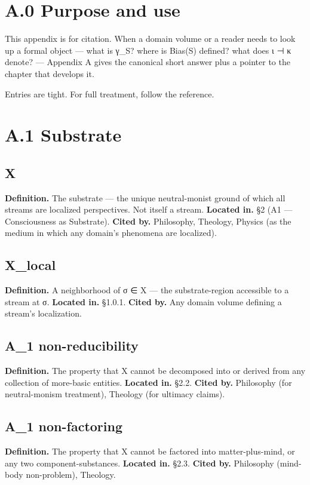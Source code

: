 \documentclass[11pt, openany]{book}
\newcommand{\sectionbreak}{\clearpage}
\begin{document}
\sectionbreak

\section{A.0 Purpose and use}

This appendix is for citation. When a domain volume or a reader needs to look up a formal object --- what is γ\_\allowbreak{}S? where is Bias(S) defined? what does ι ⊣ κ denote? --- Appendix A gives the canonical short answer plus a pointer to the chapter that develops it.

Entries are tight. For full treatment, follow the reference.

\sectionbreak

\section{A.1 Substrate}

\subsection{X}
\textbf{Definition.} The substrate --- the unique neutral-monist ground of which all streams are localized perspectives. Not itself a stream.
\textbf{Located in.} §2 (A1 --- Consciousness as Substrate).
\textbf{Cited by.} Philosophy, Theology, Physics (as the medium in which any domain's phenomena are localized).

\subsection{X\_\allowbreak{}local}
\textbf{Definition.} A neighborhood of σ ∈ X --- the substrate-region accessible to a stream at σ.
\textbf{Located in.} §1.0.1.
\textbf{Cited by.} Any domain volume defining a stream's localization.

\subsection{A\_\allowbreak{}1 non-reducibility}
\textbf{Definition.} The property that X cannot be decomposed into or derived from any collection of more-basic entities.
\textbf{Located in.} §2.2.
\textbf{Cited by.} Philosophy (for neutral-monism treatment), Theology (for ultimacy claims).

\subsection{A\_\allowbreak{}1 non-factoring}
\textbf{Definition.} The property that X cannot be factored into matter-plus-mind, or any two component-substances.
\textbf{Located in.} §2.3.
\textbf{Cited by.} Philosophy (mind-body non-problem), Theology.
\end{document}
